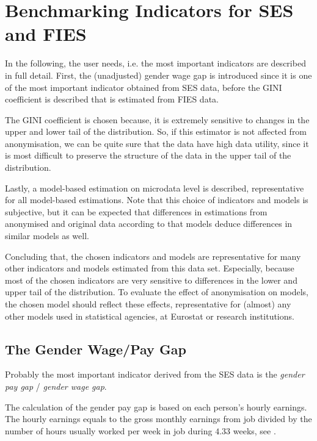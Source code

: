 \documentclass[12pt]{article}
\begin{document}
\section{Benchmarking Indicators for SES and FIES} \label{sec:ind} \label{appB}


In the following, the user needs, i.e. the most important indicators  
are described in full detail. First, the (unadjusted) gender wage gap is
introduced since it is one of the most important indicator obtained from SES
data, before the GINI coefficient is described that is estimated from FIES data. %
 
The GINI coefficient is chosen because, it is extremely sensitive to changes in the upper 
and lower tail of the distribution. So, if this estimator is not 
affected from anonymisation, we can be quite sure that the data have 
high data utility, since it is most difficult to preserve the structure 
of the data in the upper tail of the distribution.

Lastly, a model-based estimation on microdata level is 
described, representative for all model-based estimations.
Note that this choice of indicators and models is subjective, but it
can be expected that differences in estimations from anonymised and original
data according to that models deduce differences in similar models as well.

Concluding that, the
chosen indicators and models are representative for many other indicators 
and models estimated from this data set. Especially, because most of the chosen indicators are very
sensitive to differences in the lower and upper tail of the distribution. 
To evaluate the effect of anonymisation on models, the chosen model should
reflect these effects, representative for (almost) any other models used in
statistical agencies, at Eurostat or research institutions.


\subsection{The Gender Wage/Pay Gap}
\label{sec:gpg}

Probably the most important indicator derived from the SES data is the 
\textit{gender pay gap} / \textit{gender wage gap}. 

The calculation of the gender pay gap is based on each person's hourly earnings.
The hourly earnings equals to the gross monthly earnings from job divided by
the number of hours usually worked per week in job during $4.33$ weeks, see
\citep{EU-SILC09,beblot03}.
\end{document}
